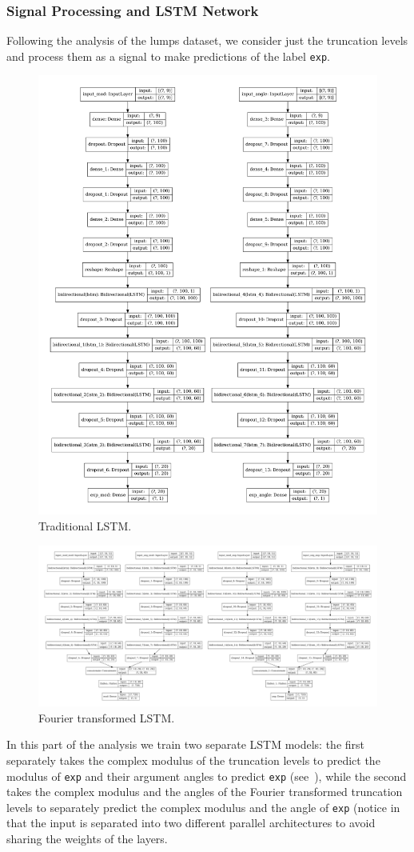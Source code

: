 \subsubsection{Signal Processing and LSTM Network}

Following the analysis of the lumps dataset, we consider just the truncation levels and process them as a signal to make predictions of the label \texttt{exp}.

\begin{figure}[htbp]
  \centering
  \includegraphics[width=0.45\linewidth]{img/wzw_ann_arch_lstm}
  \caption{Traditional LSTM.}
  \label{fig:wzw:lstm_trad}
\end{figure}

\begin{figure}[htbp]
  \centering
  \includegraphics[width=0.95\linewidth]{img/wzw_ann_arch_lstm_fft}
  \caption{Fourier transformed LSTM.}
  \label{fig:wzw:lstm_fft}
\end{figure}

In this part of the analysis we train two separate LSTM models: the first separately takes the complex modulus of the truncation levels to predict the modulus of \texttt{exp} and their argument angles to predict \texttt{exp} (see~), while the second takes the complex modulus and the angles of the Fourier transformed truncation levels to separately predict the complex modulus and the angle of \texttt{exp} (notice in~ that the input is separated into two different parallel architectures to avoid sharing the weights of the layers.

